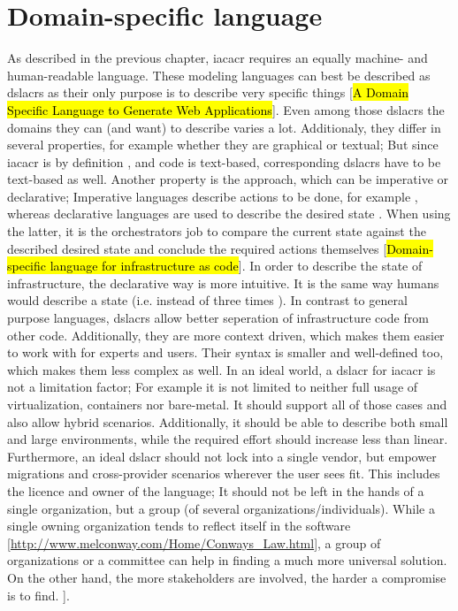 \section{Domain-specific language}
As described in the previous chapter, \gls{iacacr} requires an equally machine- and human-readable language. These modeling languages can best be described as \gls{dslacr}s as their only purpose is to describe very specific things [\hl{A Domain Specific Language to Generate Web Applications}]. Even among those \gls{dslacr}s the domains they can (and want) to describe varies a lot. Additionaly, they differ in several properties, for example whether they are graphical or textual; But since \gls{iacacr} is by definition , and code is text-based, corresponding \gls{dslacr}s have to be text-based as well.
Another property is the approach, which can be imperative or declarative; Imperative languages describe actions to be done, for example , whereas declarative languages are used to describe the desired state . When using the latter, it is the orchestrators job to compare the current state against the described desired state and conclude the required actions themselves [\hl{Domain-specific language for infrastructure as code}].
In order to describe the state of infrastructure, the declarative way is more intuitive. It is the same way humans would describe a state (i.e.  instead of three times ).
\newline
In contrast to general purpose languages, \gls{dslacr}s allow better seperation of infrastructure code from other code. Additionally, they are more context driven, which makes them easier to work with for experts and users. Their syntax is smaller and well-defined too, which makes them less complex as well.
\newline
In an ideal world, a \gls{dslacr} for \gls{iacacr} is not a limitation factor; For example it is not limited to neither full usage of virtualization, containers nor bare-metal. It should support all of those cases and also allow hybrid scenarios. Additionally, it should be able to describe both small and large environments, while the required effort should increase less than linear. Furthermore, an ideal \gls{dslacr} should not lock into a single vendor, but empower migrations and cross-provider scenarios wherever the user sees fit. This includes the licence and owner of the language; It should not be left in the hands of a single organization, but a group (of several organizations/individuals). While a single owning organization tends to reflect itself in the software [\url{http://www.melconway.com/Home/Conways_Law.html}], a group of organizations or a committee can help in finding a much more universal solution. On the other hand, the more stakeholders are involved, the harder a compromise is to find.
].

